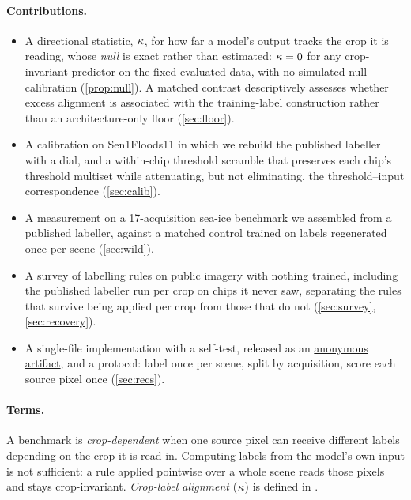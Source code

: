 \paragraph{Contributions.}
\begin{itemize}\itemsep2pt \parskip0pt 
\item A directional statistic, $\kappa$, for how far a model's output tracks the
  crop it is reading, whose \emph{null} is exact rather than estimated: $\kappa = 0$
  for any crop-invariant predictor on the fixed evaluated data, with no simulated
  null calibration (\cref{prop:null}). A matched contrast descriptively assesses
  whether excess alignment is associated with the training-label construction rather than an
  architecture-only floor (\cref{sec:floor}).
\item A calibration on Sen1Floods11 in which we rebuild the published labeller with
  a dial, and a within-chip threshold scramble that preserves each chip's threshold
  multiset while attenuating, but not eliminating, the threshold--input
  correspondence (\cref{sec:calib}).
\item A measurement on a 17-acquisition sea-ice benchmark we assembled from a
  published labeller, against a matched control trained on labels regenerated once
  per scene (\cref{sec:wild}).
\item A survey of labelling rules on public imagery with nothing trained, including
  the published labeller run per crop on chips it never saw, separating the rules
  that survive being applied per crop from those that do not
  (\cref{sec:survey}, \cref{sec:recovery}).
\item A single-file implementation with a self-test, released as an
  \href{\anonymousCodeURL}{anonymous artifact}, and a protocol: label once per
  scene, split by acquisition, score each source pixel once (\cref{sec:recs}).
\end{itemize}

\paragraph{Terms.} A benchmark is \emph{crop-dependent} when one source pixel can
receive different labels depending on the crop it is read in. Computing labels from
the model's own input is not sufficient: a rule applied pointwise over a whole scene
reads those pixels and stays crop-invariant. \emph{Crop-label alignment} ($\kappa$) is defined in
.
